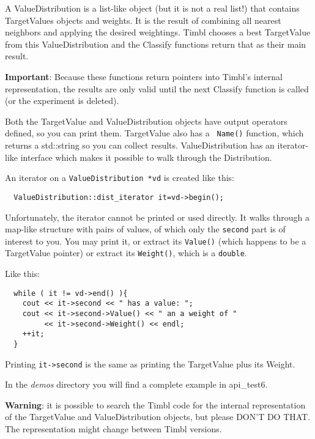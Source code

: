 \documentclass{report}
\begin{document}
A ValueDistribution is a list-like object (but it is not a real list!)
that contains TargetValues objects and weights. It is the result of
combining all nearest neighbors and applying the desired weightings.
Timbl chooses a best TargetValue from this ValueDistribution and the
Classify functions return that as their main result.

{\bf Important}: Because these functions return pointers into Timbl's
internal representation, the results are only valid until the next
Classify function is called (or the experiment is deleted).

Both the TargetValue and ValueDistribution objects have output
operators defined, so you can print them.  TargetValue also has a {\tt
  Name()} function, which returns a std::string so you can collect
results.  ValueDistribution has an iterator-like interface which makes
it possible to walk through the Distribution.

An iterator on a {\tt ValueDistribution *vd} is created like this:
\begin{footnotesize}
\begin{verbatim}
  ValueDistribution::dist_iterator it=vd->begin();
\end{verbatim}
\end{footnotesize}

Unfortunately, the iterator cannot be printed or used directly.
It walks through a map-like structure with pairs of values, of which
only the {\tt second} part is of interest to you.
You may print it, or extract its {\tt Value()} (which happens to be a
TargetValue pointer) or extract its {\tt Weight()}, which is a {\tt double}.

Like this:
\begin{footnotesize}
\begin{verbatim}
  while ( it != vd->end() ){
    cout << it->second << " has a value: ";
    cout << it->second->Value() << " an a weight of "
         << it->second->Weight() << endl;
    ++it;
  }
\end{verbatim}
\end{footnotesize}

Printing {\tt it->second} is the same as printing the
TargetValue plus its Weight.

In the {\em demos}\/ directory you will find a complete example in api\_test6.

{\bf Warning}: it is possible to search the Timbl code for the
internal representation of the TargetValue and ValueDistribution
objects, but please DON'T DO THAT.  The representation might change
between Timbl versions.
\end{document}
